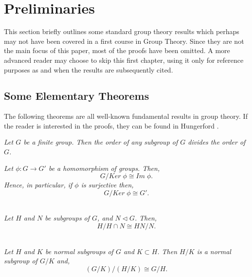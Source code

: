 \chapter{Preliminaries}\label{Ch3_Preliminaries}

This section briefly outlines some standard group theory results which perhaps may not have been covered in a first course in Group Theory. Since they are not the main focus of this paper, most of the proofs have been omitted. A more
advanced reader may choose to skip this first chapter, using it only for reference purposes as and when the results are subsequently cited. 

\section{Some Elementary Theorems}

The following theorems are all well-known fundamental results in group theory. If the reader is interested in the proofs, they can be found in Hungerford \cite{hungerford}.

\begin{theorem}\label{lagrange} \textit{Let $G$ be a finite group. Then the order of any subgroup of $G$ divides the order of $G$.} \\
\end{theorem} 

\begin{theorem}\label{1stiso} \textit{Let $\phi  :G \rightarrow G'$ be a homomorphism of groups. Then, $$G/Ker \; \phi \cong Im \; \phi.$$ Hence, in particular, if $\phi$ is surjective then, $$G/Ker \; \phi \cong G'.$$} \\
\end{theorem} 

\vspace{-10mm}

\begin{theorem}\label{2ndiso} \textit{Let $H$ and $N$ be subgroups of $G$, and $N \vartriangleleft G$. Then, $$H/H \cap N \cong HN/N.$$} \\
\end{theorem} 

\vspace{-10mm}

\begin{theorem}\label{3rdiso} \textit{Let $H$ and $K$ be normal subgroups of $G$ and $K \subset H$. Then $H/K$ is a normal subgroup of $G/K$ and, $$(G/K)/(H/K) \cong G/H.$$} \\
\end{theorem} 

